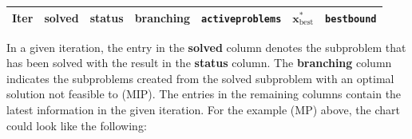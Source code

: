 \documentclass[]{book}
\theoremstyle{definition}
\theoremstyle{definition}
\theoremstyle{remark}
\begin{document}
\begin{longtable}[]{@{}ccccccc@{}}
\toprule
\begin{minipage}[b]{0.08\columnwidth}\centering\strut
\textbf{Iter}\strut
\end{minipage} & \begin{minipage}[b]{0.08\columnwidth}\centering\strut
\textbf{solved}\strut
\end{minipage} & \begin{minipage}[b]{0.09\columnwidth}\centering\strut
\textbf{status}\strut
\end{minipage} & \begin{minipage}[b]{0.08\columnwidth}\centering\strut
\textbf{branching}\strut
\end{minipage} & \begin{minipage}[b]{0.18\columnwidth}\centering\strut
\texttt{activeproblems}\strut
\end{minipage} & \begin{minipage}[b]{0.09\columnwidth}\centering\strut
\(\mathbf{x}^*_{\text{best}}\)\strut
\end{minipage} & \begin{minipage}[b]{0.12\columnwidth}\centering\strut
\texttt{bestbound}\strut
\end{minipage}\tabularnewline
\midrule
\endhead
\end{longtable}

In a given iteration, the entry in the \textbf{solved} column denotes
the subproblem that has been solved with the result in the
\textbf{status} column. The \textbf{branching} column indicates the
subproblems created from the solved subproblem with an optimal solution
not feasible to (MIP). The entries in the remaining columns contain the
latest information in the given iteration. For the example (MP) above,
the chart could look like the following:
\end{document}
